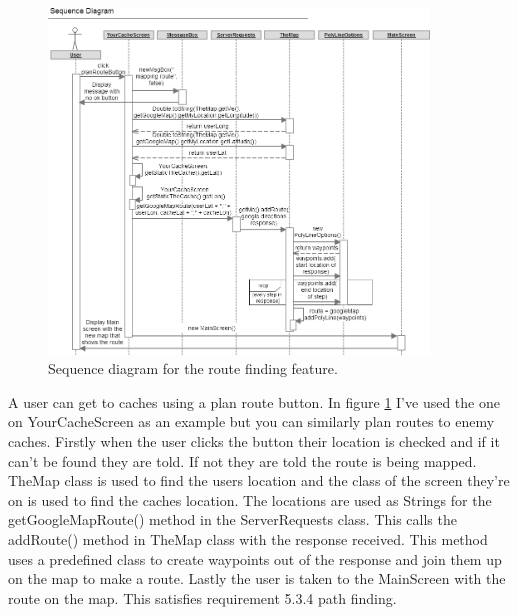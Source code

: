 \newpage
\begin{figure}
    \centering
    \includegraphics[width=0.9\textwidth]{images/sequence/getRoute}
    \caption{Sequence diagram for the route finding feature.}
    \label{fig:getRoute}
\end{figure}

A user can get to caches using a plan route button. In figure \ref{fig:getRoute} I've used the one on YourCacheScreen as an example but you can similarly plan routes to enemy caches. Firstly when the user clicks the button their location is checked and if it can't be found they are told. If not they are told the route is being mapped. TheMap class is used to find the users location and the class of the screen they're on is used to find the caches location. The locations are used as Strings for the getGoogleMapRoute() method in the ServerRequests class. This calls the addRoute() method in TheMap class with the response received. This method uses a predefined class to create waypoints out of the response and join them up on the map to make a route. Lastly the user is taken to the MainScreen with the route on the map. This satisfies requirement 5.3.4 path finding.


